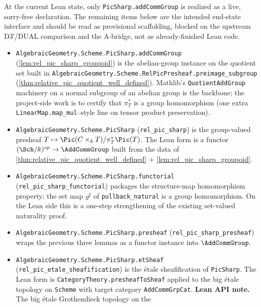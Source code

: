 At the current Lean state, only \texttt{PicSharp.addCommGroup} is realized as a
live, sorry-free declaration. The remaining items below are the intended
end-state interface and should be read as provisional scaffolding, blocked on
the upstream D3′/DUAL comparison and the A-bridge, not as already-finished
Lean code.
\begin{itemize}
  \item \texttt{AlgebraicGeometry.Scheme.PicSharp.addCommGroup}
    (\cref{lem:rel_pic_sharp_groupoid}) is the abelian-group instance on the
    quotient set built in
    \texttt{AlgebraicGeometry.Scheme.RelPicPresheaf.preimage\_subgroup}
    (\cref{thm:relative_pic_quotient_well_defined}). Mathlib's
    \texttt{QuotientAddGroup} machinery on a normal subgroup of an abelian
    group is the backbone; the project-side work is to certify that
    \(\pi_T^*\) is a group homomorphism (one extra
    \texttt{LinearMap.map\_mul}--style line on tensor product preservation).
  \item \texttt{AlgebraicGeometry.Scheme.PicSharp}
    (\texttt{rel\_pic\_sharp}) is the group-valued presheaf
    \(T \mapsto \Pic(C \times_k T)/\pi_T^*\Pic(T)\). The Lean form is a functor
    \((\Sch/k)^{op} \to \AddCommGroup\) built from the data of
    \cref{thm:relative_pic_quotient_well_defined} +
    \cref{lem:rel_pic_sharp_groupoid}.
  \item \texttt{AlgebraicGeometry.Scheme.PicSharp.functorial}
    (\texttt{rel\_pic\_sharp\_functorial}) packages the structure-map
    homomorphism property: the set map \(g^\sharp\) of
    \texttt{pullback\_natural} is a group homomorphism. On the Lean side
    this is a one-step strengthening of the existing set-valued naturality
    proof.
  \item \texttt{AlgebraicGeometry.Scheme.PicSharp.presheaf}
    (\texttt{rel\_pic\_sharp\_presheaf}) wraps the previous three lemmas as a
    functor instance into \(\AddCommGroup\).
  \item \texttt{AlgebraicGeometry.Scheme.PicSharp.etSheaf}
    (\texttt{rel\_pic\_etale\_sheafification}) is the \'etale sheafification
    of \texttt{PicSharp}. The Lean form is
    \texttt{CategoryTheory.presheafToSheaf} applied to the big \'etale
    topology on \texttt{Scheme} with target category
    \texttt{AddCommGrpCat}.
    \textbf{Lean API note.} The big \'etale Grothendieck topology on the

\end{itemize}
